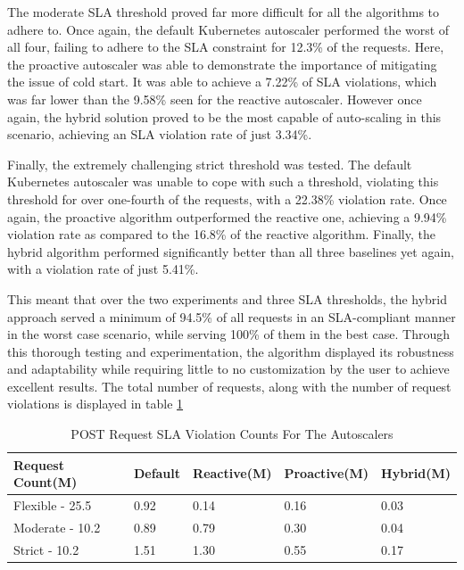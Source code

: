 The moderate SLA threshold proved far more difficult for all the algorithms to adhere to. Once again, the default Kubernetes autoscaler performed the worst of all four, failing to adhere to the SLA constraint for 12.3\% of the requests. Here, the proactive autoscaler was able to demonstrate the importance of mitigating the issue of cold start. It was able to achieve a 7.22\% of SLA violations, which was far lower than the 9.58\% seen for the reactive autoscaler. However once again, the hybrid solution proved to be the most capable of auto-scaling in this scenario, achieving an SLA violation rate of just 3.34\%.

Finally, the extremely challenging strict threshold was tested. The default Kubernetes autoscaler was unable to cope with such a threshold, violating this threshold for over one-fourth of the requests, with a 22.38\% violation rate. Once again, the proactive algorithm outperformed the reactive one, achieving a 9.94\% violation rate as compared to the 16.8\% of the reactive algorithm. Finally, the hybrid algorithm performed significantly better than all three baselines yet again, with a violation rate of just 5.41\%.\par

This meant that over the two experiments and three SLA thresholds, the hybrid approach served a minimum of 94.5\% of all requests in an SLA-compliant manner in the worst case scenario, while serving 100\% of them in the best case. Through this thorough testing and experimentation, the algorithm displayed its robustness and adaptability while requiring little to no customization by the user to achieve excellent results. The total number of requests, along with the number of request violations is displayed in table \ref{tab:exp2-sla-violation-count}

\begin{table}
    \caption{POST Request SLA Violation Counts For The Autoscalers}\label{tab:exp2-sla-violation-count}
    \centering
    \begin{tabular}{|l|l|l|l|l|}
        \hline
        Request Count(M) & Default & Reactive(M) & Proactive(M) & Hybrid(M)\\
        \hline
        Flexible - 25.5  & 0.92 & 0.14 & 0.16 & 0.03\\
        Moderate - 10.2 & 0.89 & 0.79 & 0.30 & 0.04\\
        Strict - 10.2 & 1.51 & 1.30 & 0.55 & 0.17\\
        \hline
    \end{tabular}
\end{table}
